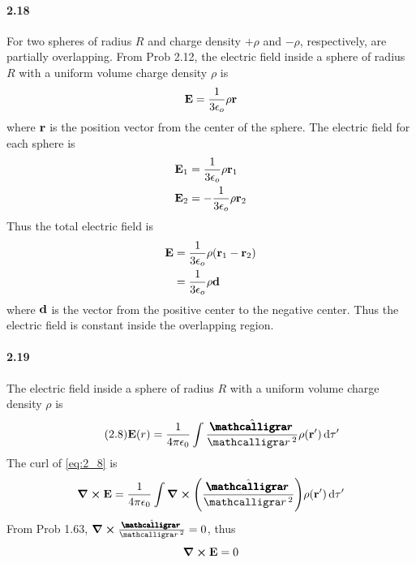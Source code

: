 \documentclass[../main.tex]{subfiles}
\begin{document}
\paragraph{2.18}
For two spheres of radius $R$ and charge density $+\rho$ and $-\rho$, respectively, are partially
overlapping. From Prob 2.12, the electric field inside a sphere of radius $R$ with a uniform volume
charge density $\rho$ is
\[ \vb{E} = \frac{1}{3\epsilon_o} \rho \vb{r} \]
where $\vb{r}$ is the position vector from the center of the sphere. The electric field for each 
sphere is
\begin{align*}
    \vb{E}_1 &= \frac{1}{3\epsilon_o} \rho \vb{r}_1 \\
    \vb{E}_2 &= -\frac{1}{3\epsilon_o} \rho \vb{r}_2
\end{align*}
Thus the total electric field is
\begin{align*}
    \vb{E} &= \frac{1}{3\epsilon_o} \rho (\vb{r}_1 - \vb{r}_2) \\
    &= \frac{1}{3\epsilon_o} \rho \vb{d}
\end{align*}
where $\vb{d}$ is the vector from the positive center to the negative center. Thus the electric
field is constant inside the overlapping region.

\paragraph{2.19}
The electric field inside a sphere of radius $R$ with a uniform volume charge density $\rho$ is
\[\tag{2.8} \label{eq:2_8}
    \vb{E}(r) = \ke \int \frac{\hat \boldscriptr}{\scriptr^2} \rho(\vb{r}') \dd{\tau'}
\]
The curl of \eqref{eq:2_8} is
\[
    \curl \vb{E} = \ke \int \curl \qt(\frac{\hat \boldscriptr}{\scriptr^2}) \rho(\vb{r}') \dd{\tau'}
\]
From Prob 1.63, \( \curl \frac{\hat \boldscriptr}{\scriptr^2} = 0 \), thus
\[ \curl \vb{E} = 0 \]
\end{document}
